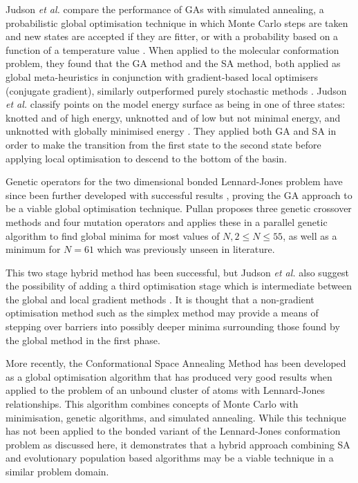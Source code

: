 \documentclass{article}
\begin{document}
Judson \textit{et al.} compare the performance of GAs with simulated annealing,
a probabilistic global optimisation technique in which Monte Carlo steps are
taken and new states are accepted if they are fitter, or with a probability
based on a function of a temperature value \cite{doi:10.1002/qua.560440214}.
When applied to the molecular conformation problem, they found that the GA
method and the SA method, both applied as global meta-heuristics in conjunction
with gradient-based local optimisers (conjugate gradient), similarly
outperformed purely stochastic methods \cite{doi:10.1002/qua.560440214}. Judson
\textit{et al.} classify points on the model energy surface as being in one of
three states: knotted and of high energy, unknotted and of low but not minimal
energy, and unknotted with globally minimised energy
\cite{doi:10.1002/qua.560440214}. They applied both GA and SA in order to make
the transition from the first state to the second state before applying local
optimisation to descend to the bottom of the basin.

Genetic operators for the two dimensional bonded Lennard-Jones problem have
since been further developed with successful results \cite{PULLAN1998331},
proving the GA approach to be a viable global optimisation technique. Pullan
\cite{PULLAN1998331} proposes three genetic crossover methods and four mutation
operators and applies these in a parallel genetic algorithm to find global
minima for most values of $N, 2 \leq N \leq 55$, as well as a minimum for $N =
61$ which was previously unseen in literature.

This two stage hybrid method has been successful, but Judson \textit{et al.}
also suggest the possibility of adding a third optimisation stage which is
intermediate between the global and local gradient methods
\cite{doi:10.1002/qua.560440214}. It is thought that a non-gradient optimisation
method such as the simplex method may provide a means of stepping over barriers
into possibly deeper minima surrounding those found by the global method in the
first phase.

More recently, the Conformational Space Annealing Method
\cite{PhysRevLett.91.080201} has been developed as a global optimisation
algorithm that has produced very good results when applied to the problem of an
unbound cluster of atoms with Lennard-Jones relationships. This algorithm
combines concepts of Monte Carlo with minimisation, genetic algorithms, and
simulated annealing. While this technique has not been applied to the bonded
variant of the Lennard-Jones conformation problem as discussed here, it
demonstrates that a hybrid approach combining SA and evolutionary population
based algorithms may be a viable technique in a similar problem domain.
\end{document}
